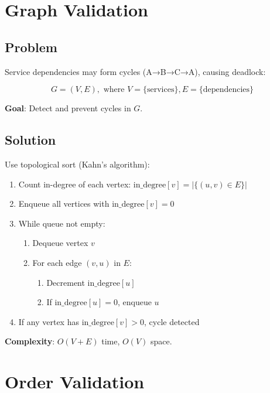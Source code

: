 \documentclass[12pt,twoside,openright]{book}
\theoremstyle{plain}
\theoremstyle{definition}
\theoremstyle{remark}
\begin{document}
\section{Graph Validation}

\subsection{Problem}

Service dependencies may form cycles (A→B→C→A), causing deadlock:

$$G = (V, E), \text{ where } V = \{\text{services}\}, E = \{\text{dependencies}\}$$

\textbf{Goal}: Detect and prevent cycles in $G$.

\subsection{Solution}

Use topological sort (Kahn's algorithm):

\begin{algorithm}
\caption{Topological Sort (Cycle Detection)}
\begin{enumerate}
  \item Count in-degree of each vertex: $\text{in\_degree}[v] = |\{(u, v) \in E\}|$
  \item Enqueue all vertices with $\text{in\_degree}[v] = 0$
  \item While queue not empty:
    \begin{enumerate}
      \item Dequeue vertex $v$
      \item For each edge $(v, u)$ in $E$:
        \begin{enumerate}
          \item Decrement $\text{in\_degree}[u]$
          \item If $\text{in\_degree}[u] = 0$, enqueue $u$
        \end{enumerate}
    \end{enumerate}
  \item If any vertex has $\text{in\_degree}[v] > 0$, cycle detected
\end{enumerate}
\end{algorithm}

\textbf{Complexity}: $O(V + E)$ time, $O(V)$ space.

\section{Order Validation}
\end{document}
